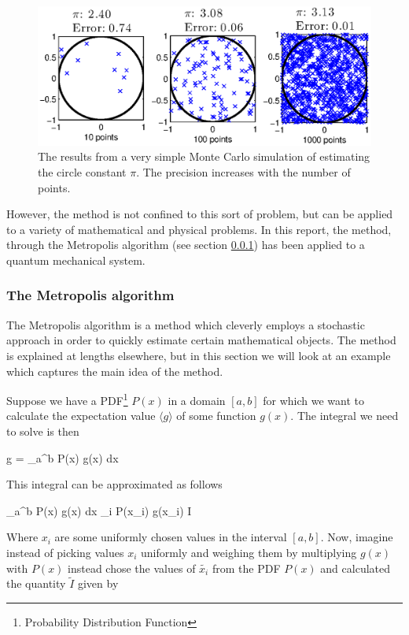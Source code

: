 \begin{figure}[h!]
        \centering 
        \includegraphics[width=\textwidth]{theory/Monte_Carlo_Illustration.eps}
        \caption{The results from a very simple Monte Carlo simulation of 
        estimating the circle constant $\pi$. 
        The precision increases with the number of points.}
        \label{fig:Monte_Carlo_Illustration}
\end{figure}

However, the method is not confined to this sort of problem, but can be applied to a variety of mathematical and physical problems. 
In this report, the method, through the Metropolis algorithm (see section \ref{sec:theory_metropolis}) has been applied to a quantum mechanical system.


\subsubsection{The Metropolis algorithm} \label{sec:theory_metropolis}

The Metropolis algorithm is a method which cleverly employs a stochastic approach in order to quickly estimate certain mathematical objects.
The method is explained at lengths elsewhere\cite{lecturenotes}, but in this section we will look at an example which captures the main idea of the method.

Suppose we have a PDF\footnote{Probability Distribution Function} $P(x)$ in a domain $[a,b]$ for which we want to calculate the expectation value $\langle g \rangle$ of some function $g(x)$. 
The integral we need to solve is then 

\eqs
\langle g \rangle = \int_a^b P(x) g(x) dx 
\eqf

This integral can be approximated as follows

\eqs
\int_a^b P(x) g(x) dx \approx {} \sum_i P(x_i) g(x_i) \equiv I 
\eqf

Where $x_i$ are some uniformly chosen values in the interval $[a,b]$. 
Now, imagine instead of picking values $x_i$ uniformly and weighing them by multiplying $g(x)$ with $P(x)$ instead chose the values of $\tilde{x_i}$ from the PDF $P(x)$ and calculated the quantity $\tilde{I}$ given by

